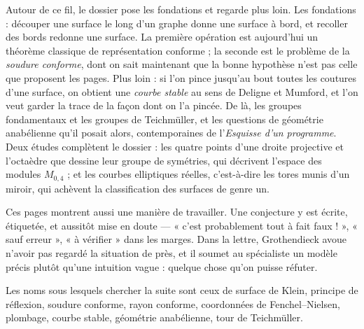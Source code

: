 \documentclass[11pt,a4paper]{article}
\begin{document}
\begin{resume}
Autour de ce fil, le dossier pose les fondations et regarde plus loin. Les
fondations : découper une surface le long d'un graphe donne une surface à
bord, et recoller des bords redonne une surface. La première opération est
aujourd'hui un théorème classique de représentation conforme ; la seconde est
le problème de la \emph{soudure conforme}, dont on sait maintenant que la
bonne hypothèse n'est pas celle que proposent les pages. Plus loin : si l'on
pince jusqu'au bout toutes les coutures d'une surface, on obtient une
\emph{courbe stable} au sens de Deligne et Mumford, et l'on veut garder la
trace de la façon dont on l'a pincée. De là, les groupes fondamentaux et les
groupes de Teichmüller, et les questions de géométrie anabélienne qu'il posait
alors, contemporaines de l'\emph{Esquisse d'un programme}. Deux études
complètent le dossier : les quatre points d'une droite projective et
l'octaèdre que dessine leur groupe de symétries, qui décrivent l'espace des
modules $M_{0,4}$ ; et les courbes elliptiques réelles, c'est-à-dire les tores
munis d'un miroir, qui achèvent la classification des surfaces de genre un.

Ces pages montrent aussi une manière de travailler. Une conjecture y est
écrite, étiquetée, et aussitôt mise en doute --- « c'est probablement tout à
fait faux ! », « sauf erreur », « à vérifier » dans les marges. Dans la
lettre, Grothendieck avoue n'avoir pas regardé la situation de près, et il
soumet au spécialiste un modèle précis plutôt qu'une intuition vague :
quelque chose qu'on puisse réfuter.

Les noms sous lesquels chercher la suite sont ceux de surface de Klein,
principe de réflexion, soudure conforme, rayon conforme, coordonnées de
Fenchel--Nielsen, plombage, courbe stable, géométrie anabélienne, tour de
Teichmüller.

\end{resume}

\end{document}
